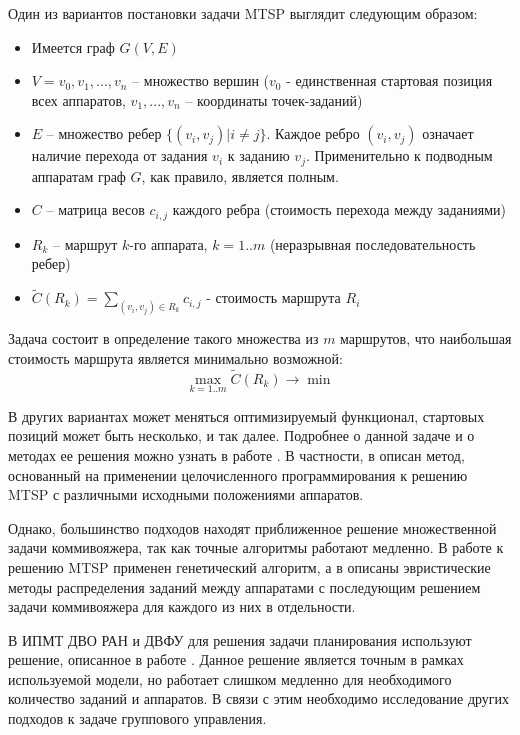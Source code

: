 \documentclass[a4paper,14pt,russian]{article}
\begin{document}
Один из вариантов постановки задачи MTSP выглядит следующим образом:
\begin{itemize}
\item Имеется граф $G(V, E)$
\item $V = {v_0, v_1, ... , v_n}$ -- множество вершин ($v_0$ - единственная стартовая позиция всех аппаратов, $v_1, ..., v_n$ -- координаты точек-заданий)
\item $E$ -- множество ребер $\{(v_i, v_j) | i \neq j\}$. Каждое ребро $(v_i, v_j)$ означает наличие перехода от задания $v_i$ к заданию $v_j$. Применительно к подводным аппаратам граф $G$, как правило, является полным.
\item $C$ -- матрица весов $c_{i,j}$ каждого ребра (стоимость перехода между заданиями)
\item $R_k$ -- маршрут $k$-го аппарата, $k=1..m$ (неразрывная последовательность ребер)
\item $\widetilde{C}(R_k) = \displaystyle\sum_{(v_i, v_j) \in R_k} c_{i,j}$ - стоимость маршрута $R_i$
\end{itemize}
Задача состоит в определение такого множества из $m$ маршрутов, что наибольшая стоимость маршрута является минимально возможной:
\begin{equation} \label{mtsp1}
\displaystyle \max_{k=1..m} \widetilde{C}(R_k) \rightarrow \min
\end{equation}

В других вариантах может меняться оптимизируемый функционал, стартовых позиций может быть несколько, и так далее. Подробнее о данной задаче и о методах ее решения можно узнать в работе \cite{bektas2006multiple}.
В частности, в \cite{binaryprog} описан метод, основанный на применении целочисленного программирования к решению MTSP с различными исходными положениями аппаратов.

Однако, большинство подходов находят приближенное решение множественной задачи коммивояжера, так как точные алгоритмы работают медленно. В работе \cite{kiraly2010novel} к решению MTSP применен генетический алгоритм, а в \cite{na2007heurisic} описаны эвристические методы распределения заданий между аппаратами с последующим решением задачи коммивояжера для каждого из них в отдельности.

В ИПМТ ДВО РАН и ДВФУ для решения задачи планирования используют решение, описанное в работе \cite{tuphanov1}. Данное решение является точным в рамках используемой модели, но работает слишком медленно для необходимого количество заданий и аппаратов. В связи с этим необходимо исследование других подходов к задаче группового управления.
\end{document}
